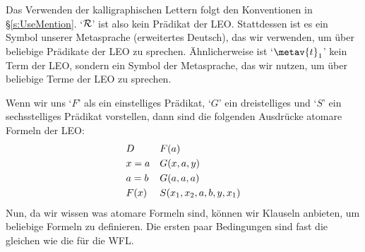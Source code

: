 

Das Verwenden der kalligraphischen Lettern folgt den Konventionen in \S\ref{s:UseMention}. `$\mathcal{R}$' ist also kein Prädikat der LEO. Stattdessen ist es ein Symbol unserer Metasprache (erweitertes Deutsch), das wir verwenden, um über beliebige Prädikate der LEO zu sprechen. Ähnlicherweise ist `$\metav{t}_1$' kein Term der LEO, sondern ein Symbol der Metasprache, das wir nutzen, um über beliebige Terme der LEO zu sprechen. 

Wenn wir uns `$F$' als ein einstelliges Prädikat, `$G$' ein dreistelliges und `$S$' ein sechsstelliges Prädikat vorstellen, dann sind die folgenden Ausdrücke atomare Formeln der LEO:
	\begin{align*}
		& D &&  \mathord{F}(a)\\
		& x = a && \mathord{G}(x,a,y)\\
		& a = b && \mathord{G}(a,a,a)\\
		& \mathord{F}(x) && \mathord{S}(x_1, x_2, a, b, y, x_1)\\
	\end{align*}
Nun, da wir wissen was atomare Formeln sind, können wir Klauseln anbieten, um beliebige Formeln zu definieren. Die ersten paar Bedingungen sind fast die gleichen wie die für die WFL.
